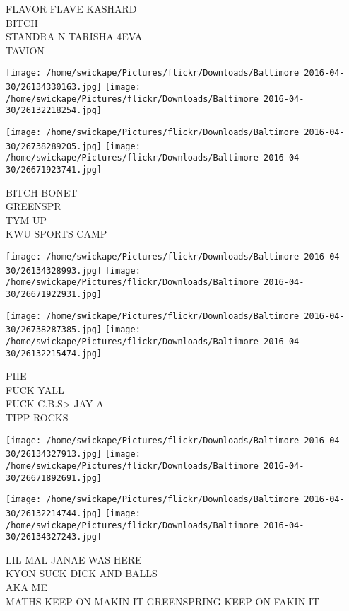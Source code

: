 \documentclass[10pt,letterpaper]{article}
\begin{document}
FLAVOR FLAVE KASHARD\\
BITCH\\
STANDRA N TARISHA 4EVA\\
TAVION\\
\pagebreak

\texttt{[image: /home/swickape/Pictures/flickr/Downloads/Baltimore 2016-04-30/26134330163.jpg]}
\texttt{[image: /home/swickape/Pictures/flickr/Downloads/Baltimore 2016-04-30/26132218254.jpg]}

\texttt{[image: /home/swickape/Pictures/flickr/Downloads/Baltimore 2016-04-30/26738289205.jpg]}
\texttt{[image: /home/swickape/Pictures/flickr/Downloads/Baltimore 2016-04-30/26671923741.jpg]}

BITCH BONET\\
GREENSPR\\
TYM UP\\
KWU SPORTS CAMP\\
\pagebreak

\texttt{[image: /home/swickape/Pictures/flickr/Downloads/Baltimore 2016-04-30/26134328993.jpg]}
\texttt{[image: /home/swickape/Pictures/flickr/Downloads/Baltimore 2016-04-30/26671922931.jpg]}

\texttt{[image: /home/swickape/Pictures/flickr/Downloads/Baltimore 2016-04-30/26738287385.jpg]}
\texttt{[image: /home/swickape/Pictures/flickr/Downloads/Baltimore 2016-04-30/26132215474.jpg]}

PHE\\
FUCK YALL\\
FUCK C.B.S> JAY{-}A\\
TIPP ROCKS\\
\pagebreak

\texttt{[image: /home/swickape/Pictures/flickr/Downloads/Baltimore 2016-04-30/26134327913.jpg]}
\texttt{[image: /home/swickape/Pictures/flickr/Downloads/Baltimore 2016-04-30/26671892691.jpg]}

\texttt{[image: /home/swickape/Pictures/flickr/Downloads/Baltimore 2016-04-30/26132214744.jpg]}
\texttt{[image: /home/swickape/Pictures/flickr/Downloads/Baltimore 2016-04-30/26134327243.jpg]}

LIL MAL JANAE WAS HERE\\
KYON SUCK DICK AND BALLS\\
AKA ME\\
MATHS KEEP ON MAKIN IT GREENSPRING KEEP ON FAKIN IT\\
\pagebreak
\end{document}

